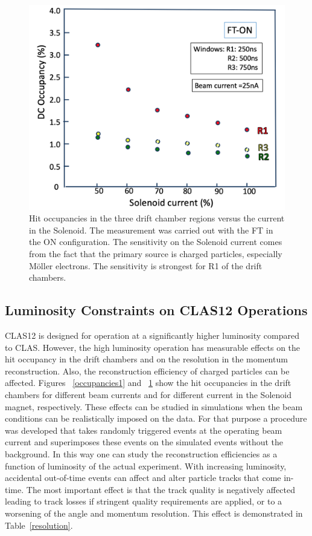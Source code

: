 \documentclass[final,3p,twocolumn]{elsarticle}
\begin{document}
\begin{figure}[htbp!]
\centerline{\includegraphics[width=1.0\columnwidth]{occupancy-solenoid.png}}
\caption{Hit occupancies in the three drift chamber regions versus the current in the Solenoid. The measurement was
carried out with the FT in the ON configuration. The sensitivity on the Solenoid current comes from the fact that the
primary source is charged particles, especially M{\"o}ller  electrons. The sensitivity is strongest for R1 of the drift
chambers.}
\label{occupancies2}
\end{figure}

\subsection{Luminosity Constraints on CLAS12 Operations}

CLAS12 is designed for operation at a significantly higher luminosity compared to CLAS. However, the high luminosity
operation has measurable effects on the hit occupancy in the drift chambers and on the resolution in the momentum
reconstruction. Also, the reconstruction efficiency of charged particles can be affected. Figures ~\ref{occupancies1}
and ~\ref{occupancies2} show the hit occupancies in the drift chambers for different beam currents and for different
current in the Solenoid magnet, respectively. These effects can be studied in simulations when the beam conditions can
be realistically imposed on the data. For that purpose a procedure was developed that takes randomly triggered events
at the operating beam current and superimposes these events on the simulated events without the background. In this
way one can study the reconstruction efficiencies as a function of luminosity of the actual experiment. With increasing
luminosity, accidental out-of-time events can affect and alter particle tracks that come in-time. The most important
effect is that the track quality is negatively affected leading to track losses if stringent quality requirements are
applied, or to a worsening of the angle and momentum resolution. This effect is demonstrated in Table~\ref{resolution}.   
\end{document}
